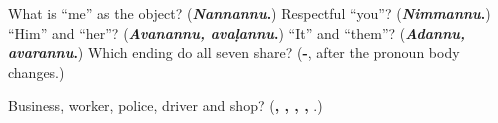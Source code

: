 \begin{tcolorbox}[breakable,colback=teal!4,colframe=teal!35!black,title={Before you move on}]
What is “me” as the object? (\textbf{\emph{Nannannu}.}) Respectful “you”? (\textbf{\emph{Nimmannu}.}) “Him” and “her”? (\textbf{\emph{Avanannu, avaḷannu}.}) “It” and “them”? (\textbf{\emph{Adannu, avarannu}.}) Which ending do all seven share? (\textbf{-}, after the pronoun body changes.)

Business, worker, police, driver and shop? (\textbf{, , , , }.)
\end{tcolorbox}
